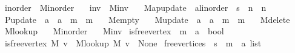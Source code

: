 \begin{isabellebody}
\ \ inorder\ {\isacharequal}{\kern0pt}\ M{\isacharunderscore}{\kern0pt}inorder\ \isanewline
\ \ inv\ {\isacharequal}{\kern0pt}\ M{\isacharunderscore}{\kern0pt}inv\ \isanewline
\ \ Map{\isacharunderscore}{\kern0pt}update\ {\isacharcolon}{\kern0pt}{\isacharcolon}{\kern0pt}\ {\isachardoublequoteopen}{\isacharprime}{\kern0pt}a{\isacharcolon}{\kern0pt}{\isacharcolon}{\kern0pt}linorder\ {\isasymRightarrow}\ {\isacharprime}{\kern0pt}s\ {\isasymRightarrow}\ {\isacharprime}{\kern0pt}n\ {\isasymRightarrow}\ {\isacharprime}{\kern0pt}n{\isachardoublequoteclose}\ \isanewline
\ \ P{\isacharunderscore}{\kern0pt}update\ {\isacharcolon}{\kern0pt}{\isacharcolon}{\kern0pt}\ {\isachardoublequoteopen}{\isacharprime}{\kern0pt}a\ {\isasymRightarrow}\ {\isacharprime}{\kern0pt}a\ {\isasymRightarrow}\ {\isacharprime}{\kern0pt}m\ {\isasymRightarrow}\ {\isacharprime}{\kern0pt}m{\isachardoublequoteclose}\ \isanewline
\ \ M{\isacharunderscore}{\kern0pt}empty\ \isanewline
\ \ M{\isacharunderscore}{\kern0pt}update\ {\isacharcolon}{\kern0pt}{\isacharcolon}{\kern0pt}\ {\isachardoublequoteopen}{\isacharprime}{\kern0pt}a\ {\isasymRightarrow}\ {\isacharprime}{\kern0pt}a\ {\isasymRightarrow}\ {\isacharprime}{\kern0pt}m\ {\isasymRightarrow}\ {\isacharprime}{\kern0pt}m{\isachardoublequoteclose}\ \isanewline
\ \ M{\isacharunderscore}{\kern0pt}delete\ \isanewline
\ \ M{\isacharunderscore}{\kern0pt}lookup\ \isanewline
\ \ M{\isacharunderscore}{\kern0pt}inorder\ \isanewline
\ \ M{\isacharunderscore}{\kern0pt}inv\isanewline
{}\isanewline
\isanewline
{}\isamarkupfalse%
\ is{\isacharunderscore}{\kern0pt}free{\isacharunderscore}{\kern0pt}vertex\ {\isacharcolon}{\kern0pt}{\isacharcolon}{\kern0pt}\ {\isachardoublequoteopen}{\isacharprime}{\kern0pt}m\ {\isasymRightarrow}\ {\isacharprime}{\kern0pt}a\ {\isasymRightarrow}\ bool{\isachardoublequoteclose}\ \isanewline
\ \ {\isachardoublequoteopen}is{\isacharunderscore}{\kern0pt}free{\isacharunderscore}{\kern0pt}vertex\ M\ v\ {\isasymequiv}\ M{\isacharunderscore}{\kern0pt}lookup\ M\ v\ {\isacharequal}{\kern0pt}\ None{\isachardoublequoteclose}\isanewline
\isanewline
{}\isamarkupfalse%
\ free{\isacharunderscore}{\kern0pt}vertices\ {\isacharcolon}{\kern0pt}{\isacharcolon}{\kern0pt}\ {\isachardoublequoteopen}{\isacharprime}{\kern0pt}s\ {\isasymRightarrow}\ {\isacharprime}{\kern0pt}m\ {\isasymRightarrow}\ {\isacharprime}{\kern0pt}a\ list{\isachardoublequoteclose}\ \isanewline

\end{isabellebody}
